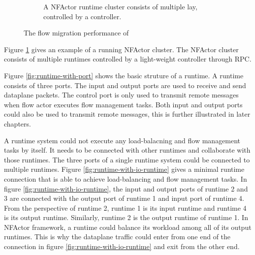 \begin{figure}[!t]
\begin{subfigure}[t]{0.99\linewidth}
    \caption{A NFActor runtime cluster consists of multiple lay, controlled by a controller.}\label{fig:runtime-cluster} \end{subfigure}
 \caption{The flow migration performance of \nfactor}
\label{fig:runtime}
\end{figure}

Figure \ref{fig:runtime-cluster} gives an example of a running NFActor cluster. The NFActor cluster consists of multiple runtimes controlled by a light-weight controller through RPC.

Figure \ref{fig:runtime-with-port} shows the basic struture of a runtime. A runtime consists of three ports. The input and output ports are used to receive and send dataplane packets. The control port is only used to transmit remote messages when flow actor executes flow management tasks. Both input and output ports could also be used to transmit remote messages, this is further illustrated in later chapters.


A runtime system could not execute any load-balacning and flow management tasks by itself. It needs to be connected with other runtimes and collaborate with those runtimes. The three ports of a single runtime system could be connected to multiple runtimes. Figure \ref{fig:runtime-with-io-runtime} gives a minimal runtime connection that is able to achieve load-balancing and flow management tasks. In figure \ref{fig:runtime-with-io-runtime}, the input and output ports of runtime 2 and 3 are connected with the output port of runtime 1 and input port of runtime 4. From the perspective of runtime 2, runtime 1 is its input runtime and runtime 4 is its output runtime. Similarly, runtime 2 is the output runtime of runtime 1. In NFActor framework, a runtime could balance its workload among all of its output runtimes. This is why the dataplane traffic could enter from one end of the connection in figure \ref{fig:runtime-with-io-runtime} and exit from the other end.

